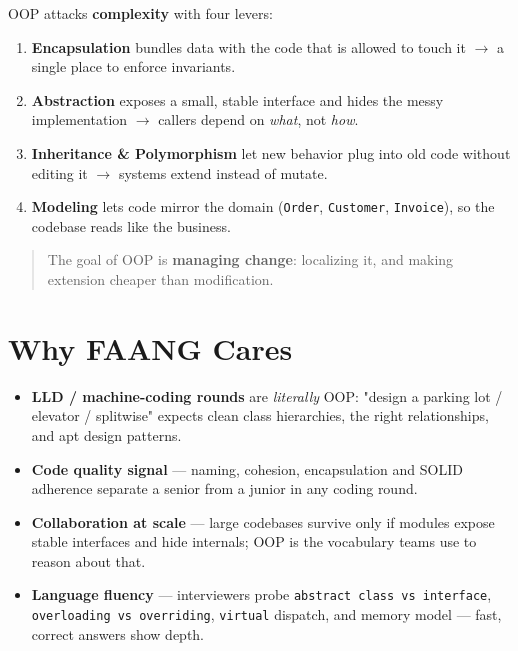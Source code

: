 \documentclass[11pt]{article}
\providecommand{\tightlist}{\setlength{\itemsep}{1pt}\setlength{\parskip}{0pt}}
\begin{document}
OOP attacks \textbf{complexity} with four levers:

\begin{enumerate}
\def\labelenumi{\arabic{enumi}.}
\tightlist
\item
  \textbf{Encapsulation} bundles data with the code that is allowed to touch it \(\rightarrow\) a single place to enforce invariants.
\item
  \textbf{Abstraction} exposes a small, stable interface and hides the messy implementation \(\rightarrow\) callers depend on \emph{what}, not \emph{how}.
\item
  \textbf{Inheritance \& Polymorphism} let new behavior plug into old code without editing it \(\rightarrow\) systems extend instead of mutate.
\item
  \textbf{Modeling} lets code mirror the domain (\texttt{Order}, \texttt{Customer}, \texttt{Invoice}), so the codebase reads like the business.
\end{enumerate}

\begin{quote}
The goal of OOP is \textbf{managing change}: localizing it, and making extension cheaper than modification.
\end{quote}

\section{Why FAANG Cares}\label{why-faang-cares}

\begin{itemize}
\tightlist
\item
  \textbf{LLD / machine-coding rounds} are \emph{literally} OOP: "design a parking lot / elevator / splitwise" expects clean class hierarchies, the right relationships, and apt design patterns.
\item
  \textbf{Code quality signal} --- naming, cohesion, encapsulation and SOLID adherence separate a senior from a junior in any coding round.
\item
  \textbf{Collaboration at scale} --- large codebases survive only if modules expose stable interfaces and hide internals; OOP is the vocabulary teams use to reason about that.
\item
  \textbf{Language fluency} --- interviewers probe \texttt{abstract\ class\ vs\ interface}, \texttt{overloading\ vs\ overriding}, \texttt{virtual} dispatch, and memory model --- fast, correct answers show depth.
\end{itemize}
\end{document}
